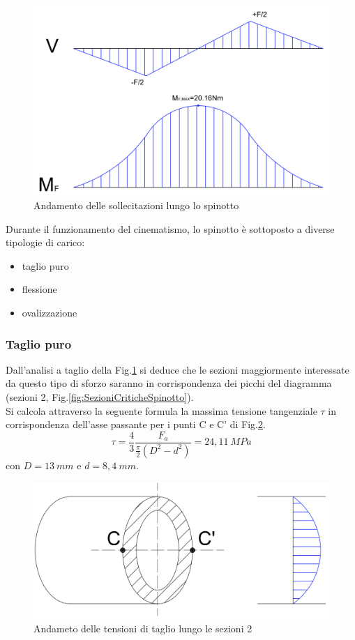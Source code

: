 \begin{figure}[h]
    \centering
    \includegraphics[scale=0.4]{Immagini/SollecitazioniSpinotto.png}
    \caption{Andamento delle sollecitazioni lungo lo spinotto}
    \label{fig:SollecitazioniSpinotto}
\end{figure}
\newpage
Durante il funzionamento del cinematismo, lo spinotto è sottoposto a diverse tipologie di carico:
\begin{itemize}
    \item taglio puro
    \item flessione
    \item ovalizzazione
\end{itemize}
\subsubsection{Taglio puro} 
Dall'analisi a taglio della Fig.\ref{fig:SollecitazioniSpinotto} si deduce che le sezioni maggiormente interessate da questo tipo di sforzo saranno in corrispondenza dei picchi del diagramma (sezioni 2, Fig.\ref{fig:SezioniCriticheSpinotto}).\\
Si calcola attraverso la seguente formula la massima tensione tangenziale $\tau$ in corrispondenza dell'asse passante per i punti C e C' di Fig.\ref{fig:TaglioSezioneSpinotto2}.
\begin{equation}
    \tau=\frac{4}{3}\frac{F_a}{\frac{\pi}{2}\left(D^2-d^2\right)}=24,11\ MPa
\end{equation}
con $D=13\ mm$ e $d=8,4\ mm$.
\begin{figure}[h]
    \centering
    \includegraphics[scale=0.4]{Immagini/TaglioSezionesSpinotto2.png}
    \caption{Andameto delle tensioni di taglio lungo le sezioni 2}
    \label{fig:TaglioSezioneSpinotto2}
\end{figure}
